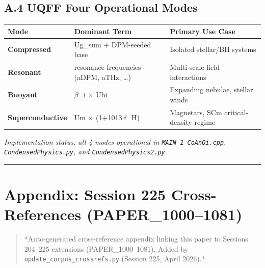 \documentclass[12pt,a4paper]{article}
\begin{document}
\subsection{A.4 UQFF Four Operational Modes}

\begin{table}[H]
\centering
\small
\begin{tabularx}{\linewidth}{@{}>{\raggedright\arraybackslash}X>{\raggedright\arraybackslash}X>{\raggedright\arraybackslash}X@{}}
\toprule
Mode & Dominant Term & Primary Use Case \tabularnewline
\midrule
\textbf{Compressed} & Ug\_sum + DPM-seeded base & Isolated stellar/BH systems \tabularnewline
\textbf{Resonant} & 5 resonance frequencies (aDPM, aTHz, \ldots{}) & Multi-scale field interactions \tabularnewline
\textbf{Buoyant} & $\beta$\_i $\times$ Ubi & Expanding nebulae, stellar winds \tabularnewline
\textbf{Superconductive} & Um $\times$ (1+1013$\cdot$f\_H) & Magnetars, SCm critical-density regime \tabularnewline
\bottomrule
\end{tabularx}
\end{table}

\emph{Implementation status: all 4 modes operational in \texttt{MAIN\_{1\_CoAnQi}.cpp}, \texttt{CondensedPhysics.py}, and \texttt{CondensedPhysics2.py}.}

\medskip\hrule\medskip

\section{Appendix: Session 225 Cross-References (PAPER\_1000--1081)}

\begin{quote}
*Auto-generated cross-reference appendix linking this paper to
Sessions 204--225 extensions (PAPER\_1000--1081). Added by
\texttt{update\_{corpus\_crossrefs}.py} (Session 225, April 2026).*
\end{quote}
\end{document}
